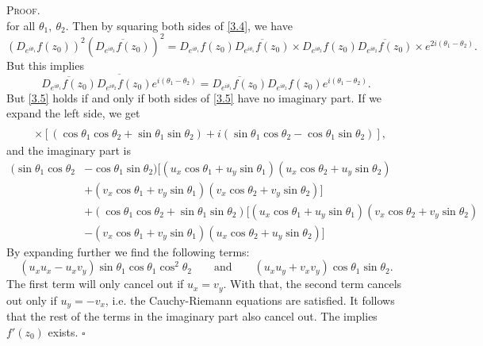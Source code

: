 \documentclass[12pt]{article}
\newcounter{ProofCounter}
\newenvironment{Proof}{\stepcounter{ProofCounter}\textsc{Proof.}}{\hfill$\square$}
\begin{document}
\begin{enumerate}[label=(\alph*),itemsep=1ex]
\begin{Proof}
\begin{equation}
\label{3.4}
\end{equation}
for all $\theta_1,\ \theta_2$. Then by squaring both sides of \eqref{3.4}, we have 
\[ (D_{e^{i\theta_1}}f(z_0))^2(\overline{D_{e^{i\theta_2}}f(z_0)})^2 = D_{e^{i\theta_1}}f(z_0)\overline{D_{e^{i\theta_1}}f(z_0)}\times D_{e^{i\theta_2}}f(z_0)
\overline{D_{e^{i\theta_2}}f(z_0)}\times e^{2i(\theta_1 - \theta_2)}. \]
But this implies 
\begin{equation}
\overline{ \overline{D_{e^{i\theta_1}}f(z_0)}D_{e^{i\theta_2}}f(z_0)e^{i(\theta_1-\theta_2)}} = 
\overline{D_{e^{i\theta_1}}f(z_0)}D_{e^{i\theta_2}}f(z_0)e^{i(\theta_1-\theta_2)}.
\label{3.5}
\end{equation}
But \eqref{3.5} holds if and only if both sides of \eqref{3.5} have no imaginary part. If we expand the left side, we get 
\begin{align*}
[(u_x\cos \theta_1 + u_y\sin\theta_1)-&i(v_x\cos\theta_1+v_y\sin\theta_1)][(u_x\cos\theta_2+u_y\sin\theta_2)+i(v_x\cos\theta_2+v_y\sin\theta_2)] \\
&\times [(\cos\theta_1\cos\theta_2 + \sin\theta_1\sin\theta_2) + i(\sin\theta_1\cos\theta_2 - \cos\theta_1\sin\theta_2)], 
\end{align*}
and the imaginary part is 
\begin{align*}
(\sin\theta_1\cos\theta_2 &- \cos\theta_1\sin\theta_2)\bigg[(u_x\cos\theta_1 + u_y\sin\theta_1)(u_x\cos\theta_2 + u_y\sin\theta_2) \\
& + (v_x\cos\theta_1 + v_y\sin\theta_1)(v_x\cos\theta_2 + v_y\sin\theta_2)\bigg] \\
& + (\cos\theta_1\cos\theta_2 + \sin\theta_1\sin\theta_2)\bigg[(u_x\cos\theta_1 + u_y\sin\theta_1)(v_x\cos\theta_2 + v_y\sin\theta_2) \\
& - (v_x\cos\theta_1 + v_y\sin\theta_1)(u_x\cos\theta_2 + u_y\sin\theta_2)\bigg]
\end{align*}
By expanding further we find the following terms:
\[ (u_xu_x - u_xv_y)\sin\theta_1\cos\theta_1\cos^2\theta_2 \qquad \text{and}\qquad (u_x u_y + v_xv_y) \cos\theta_1\sin\theta_2. \]
The first term will only cancel out if $u_x = v_y$. With that, the second term cancels out only if $u_y = -v_x$, i.e. the Cauchy-Riemann equations are satisfied. 
It follows that the rest of the terms in the imaginary part also cancel out. The implies $f'(z_0)$ exists.
\end{Proof}
\end{enumerate}
\end{document}
